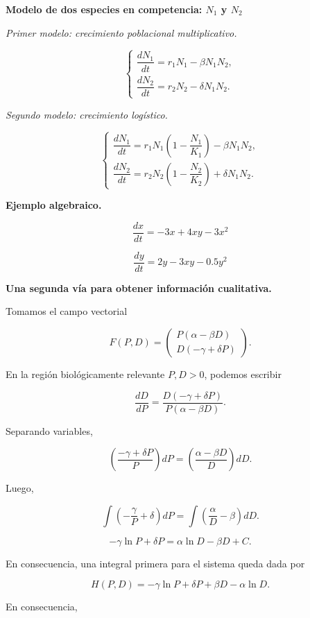 ﻿\documentclass[11pt,letterpaper]{article}
\begin{document}
\noindent \textbf{Modelo de dos especies en competencia: \(N_1\) y \(N_2\)}

\noindent \textit{Primer modelo: crecimiento poblacional multiplicativo.}

\[
\begin{cases}
\dfrac{dN_1}{dt}=r_1N_1-\beta N_1N_2,\\[4pt]
\dfrac{dN_2}{dt}=r_2N_2-\delta N_1N_2.
\end{cases}
\]

\noindent \textit{Segundo modelo: crecimiento log\'istico.}

\[
\begin{cases}
\dfrac{dN_1}{dt}=r_1N_1\left(1-\dfrac{N_1}{K_1}\right)-\beta N_1N_2,\\[4pt]
\dfrac{dN_2}{dt}=r_2N_2\left(1-\dfrac{N_2}{K_2}\right)+\delta N_1N_2.
\end{cases}
\]

\noindent \textbf{Ejemplo algebraico.}

\[
\frac{dx}{dt}=-3x+4xy-3x^2
\]

\[
\frac{dy}{dt}=2y-3xy-0.5y^2
\]

\noindent \textbf{Una segunda v\'ia para obtener informaci\'on cualitativa.}

\noindent Tomamos el campo vectorial

\[
F(P,D)=
\begin{pmatrix}
P(\alpha-\beta D)\\
D(-\gamma+\delta P)
\end{pmatrix}.
\]

\noindent En la regi\'on biol\'ogicamente relevante \(P,D>0\), podemos escribir

\[
\frac{dD}{dP}=\frac{D(-\gamma+\delta P)}{P(\alpha-\beta D)}.
\]

\noindent Separando variables,

\[
\left(\frac{-\gamma+\delta P}{P}\right)dP=\left(\frac{\alpha-\beta D}{D}\right)dD.
\]

\noindent Luego,

\[
\int\left(-\frac{\gamma}{P}+\delta\right)dP=\int\left(\frac{\alpha}{D}-\beta\right)dD.
\]

\[
-\gamma\ln P+\delta P=\alpha\ln D-\beta D+C.
\]

\noindent En consecuencia, una integral primera para el sistema queda dada por

\[
H(P,D)=-\gamma\ln P+\delta P+\beta D-\alpha\ln D.
\]

\noindent En consecuencia,
\end{document}

